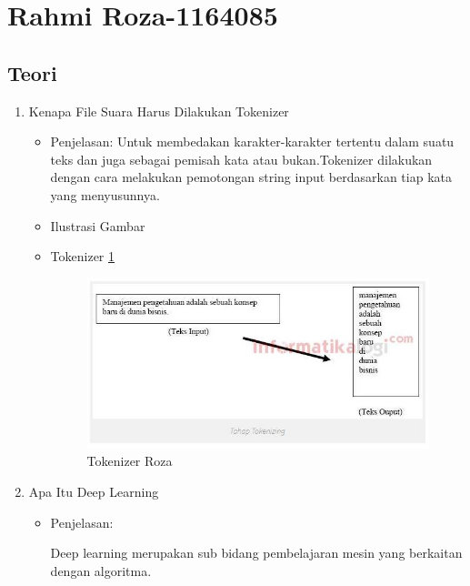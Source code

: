 \section{Rahmi Roza-1164085}
\subsection{Teori}
\begin{enumerate}
\item Kenapa File Suara Harus Dilakukan Tokenizer
\begin{itemize}
\item Penjelasan: Untuk membedakan karakter-karakter tertentu dalam suatu teks dan juga sebagai pemisah kata atau bukan.Tokenizer dilakukan dengan cara melakukan pemotongan string input berdasarkan tiap kata yang menyusunnya.
\par 
\par
\item Ilustrasi Gambar
\item Tokenizer \ref{teori1}
\begin{figure}[!hbtp]
\centering
\includegraphics[scale=0.7]{figures/teori1.jpg}
\caption{Tokenizer Roza}
\label{teori1}
\end{figure}
\par
\end{itemize}
\par
\par

\item 	Apa Itu Deep Learning
\begin{itemize}
\item Penjelasan: 
\par  Deep learning merupakan sub bidang pembelajaran mesin yang berkaitan dengan algoritma.
\end{itemize}
\par
\par


\end{enumerate}
